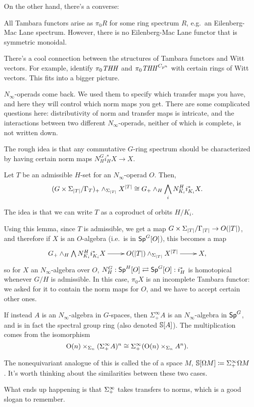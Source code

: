 On the other hand, there's a converse:
\begin{thm}
All Tambara functors arise as $\pi_0R$ for some ring spectrum $R$, e.g.\ an Eilenberg-Mac Lane spectrum. However,
there is no Eilenberg-Mac Lane functor that is symmetric monoidal.
\end{thm}
\begin{rem}
There's a cool connection between the structures of Tambara functors and Witt vectors. For example,
\cite{HM97} identify $\pi_0\mathit{THH}$ and $\pi_0\mathit{THH}^{C_{p^n}}$ with certain rings of Witt vectors. This
fits into a bigger picture.
\end{rem}
$N_\infty$-operads come back. We used them to specify which transfer maps you have, and here they will control
which norm maps you get. There are some complicated questions here: distributivity of norm and transfer maps is
intricate, and the interactions between two different $N_\infty$-operads, neither of which is complete, is not
written down.

The rough idea is that any commutative $G$-ring spectrum should be characterized by having certain norm maps
$N_H^Gi_H^*X\to X$.
\begin{lem}
Let $T$ be an admissible $H$-set for an $N_\infty$-operad $O$. Then,
\[(G\times\Sigma_{\lvert T\rvert}/\Gamma_T)_+\wedge_{\Sigma_{\lvert T\rvert}} X^{\lvert T\rvert} \cong G_+\wedge_H \bigwedge_i
N_{K_i}^Hi_{K_i}^*X.\]
\end{lem}
The idea is that we can write $T$ as a coproduct of orbits $H/K_i$.

Using this lemma, since $T$ is admissible, we get a map $G\times\Sigma_{\lvert T\rvert}/\Gamma_{\lvert T\rvert}\to O(\lvert T\rvert)$, and
therefore if $X$ is an $O$-algebra (i.e.\ is in $\mathsf{Sp}^G[O]$), this becomes a map
\[\xymatrix{
	G_+\wedge_H\bigwedge N_{K_i}^H i_{K_i}^*X\ar[r] & O(\abs T)\wedge_{\Sigma_{\abs T}} X^{\abs T}\ar[r] & X,
}\]
so for $X$ an $N_\infty$-algebra over $O$, $N_H^G: \mathsf{Sp}^H[O]\rightleftarrows \mathsf{Sp}^G[O]: i_H^*$ is homotopical
whenever $G/H$ is admissible. In this case, $\pi_0X$ is an incomplete Tambara functor: we asked for it to contain
the norm maps for $O$, and we have to accept certain other ones.

If instead $A$ is an $N_\infty$-algebra in $G$-spaces, then $\Sigma_+^\infty A$ is an $N_\infty$-algebra in
$\mathsf{Sp}^G$, and is in fact the spectral group ring (also denoted $\mathbb S[A]$). The multiplication comes from the
isomorphism
\[\mathrm O(n)\times_{\Sigma_n} (\Sigma^\infty_+A)^n\cong \Sigma^\infty_+(\mathrm O(n)\times_{\Sigma_n} A^n).\]
\begin{rem}
The nonequivariant analogue of this is called the  of a space $M$, $\mathbb S[\Omega
M]\coloneqq \Sigma_+^\infty \Omega M$. It's worth thinking about the similarities between these two cases.
\end{rem}
What ends up happening is that $\Sigma^\infty_+$ takes transfers to norms, which is a good slogan to remember.

